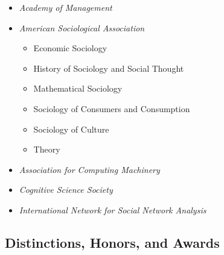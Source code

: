 \documentclass[
]{article}
\providecommand{\tightlist}{%
  \setlength{\itemsep}{0pt}\setlength{\parskip}{0pt}}
\begin{document}
\begin{itemize}
\tightlist
\item
  \emph{Academy of Management}
\item
  \emph{American Sociological Association}

  \begin{itemize}
  \tightlist
  \item
    Economic Sociology
  \item
    History of Sociology and Social Thought\\
  \item
    Mathematical Sociology
  \item
    Sociology of Consumers and Consumption
  \item
    Sociology of Culture
  \item
    Theory
  \end{itemize}
\item
  \emph{Association for Computing Machinery}
\item
  \emph{Cognitive Science Society}
\item
  \emph{International Network for Social Network Analysis}
\end{itemize}

\subsection{Distinctions, Honors, and
Awards}\label{distinctions-honors-and-awards}
\end{document}

